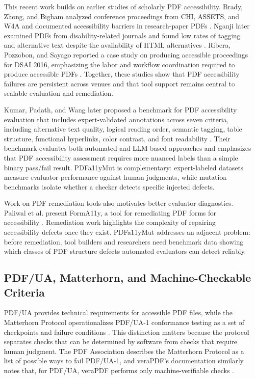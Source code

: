 \documentclass[conference]{IEEEtran}
\begin{document}
This recent work builds on earlier studies of scholarly PDF accessibility. Brady, Zhong, and Bigham analyzed conference proceedings from CHI, ASSETS, and W4A and documented accessibility barriers in research-paper PDFs \cite{brady2015pdf}. Nganji later examined PDFs from disability-related journals and found low rates of tagging and alternative text despite the availability of HTML alternatives \cite{nganji2018pdf}. Ribera, Pozzobon, and Sayago reported a case study on producing accessible proceedings for DSAI 2016, emphasizing the labor and workflow coordination required to produce accessible PDFs \cite{ribera2020proceedings}. Together, these studies show that PDF accessibility failures are persistent across venues and that tool support remains central to scalable evaluation and remediation.

Kumar, Padath, and Wang later proposed a benchmark for PDF accessibility evaluation that includes expert-validated annotations across seven criteria, including alternative text quality, logical reading order, semantic tagging, table structure, functional hyperlinks, color contrast, and font readability \cite{kumar2025benchmarking}. Their benchmark evaluates both automated and LLM-based approaches and emphasizes that PDF accessibility assessment requires more nuanced labels than a simple binary pass/fail result. PDFa11yMut is complementary: expert-labeled datasets measure evaluator performance against human judgments, while mutation benchmarks isolate whether a checker detects specific injected defects.

Work on PDF remediation tools also motivates better evaluator diagnostics. Paliwal et al. present FormA11y, a tool for remediating PDF forms for accessibility \cite{paliwal2024forma11y}. Remediation work highlights the complexity of repairing accessibility defects once they exist. PDFa11yMut addresses an adjacent problem: before remediation, tool builders and researchers need benchmark data showing which classes of PDF structure defects automated evaluators can detect reliably.

\subsection{PDF/UA, Matterhorn, and Machine-Checkable Criteria}

PDF/UA provides technical requirements for accessible PDF files, while the Matterhorn Protocol operationalizes PDF/UA-1 conformance testing as a set of checkpoints and failure conditions \cite{pdfa2021matterhorn}. This distinction matters because the protocol separates checks that can be determined by software from checks that require human judgment. The PDF Association describes the Matterhorn Protocol as a list of possible ways to fail PDF/UA-1, and veraPDF's documentation similarly notes that, for PDF/UA, veraPDF performs only machine-verifiable checks \cite{verapdfvalidation}.
\end{document}
